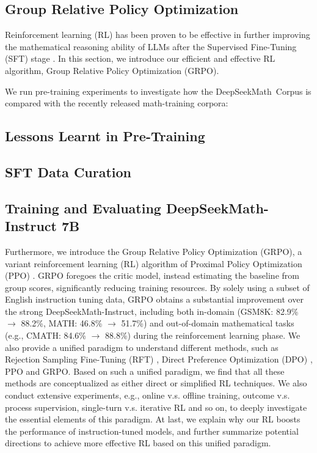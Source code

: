 \begin{itemize}[topsep=0pt]
\subsection{Group Relative Policy Optimization} Reinforcement learning (RL) has been proven to be effective in further improving the mathematical reasoning ability of LLMs after the Supervised Fine-Tuning (SFT) stage \citep{wang2023math,wizardmath}. In this section, we introduce our efficient and effective RL algorithm, Group Relative Policy Optimization (GRPO).

We run pre-training experiments to investigate how the DeepSeekMath~Corpus is compared with the recently released math-training corpora:

\subsection{Lessons Learnt in Pre-Training}

\subsection{SFT Data Curation}

\subsection{Training and Evaluating DeepSeekMath-Instruct 7B}

Furthermore, we introduce the Group Relative Policy Optimization (GRPO), a variant reinforcement learning (RL) algorithm of Proximal Policy Optimization (PPO) \citep{schulman2017proximal}. GRPO foregoes the critic model, instead estimating the baseline from group scores, significantly reducing training resources. By solely using a subset of English instruction tuning data, GRPO obtains a substantial improvement over the strong DeepSeekMath-Instruct, including both in-domain (GSM8K: 82.9\% $\rightarrow$ 88.2\%, MATH: 46.8\% $\rightarrow$ 51.7\%) and out-of-domain mathematical tasks (e.g., CMATH: 84.6\% $\rightarrow$ 88.8\%) during the reinforcement learning phase. We also provide a unified paradigm to understand different methods, such as Rejection Sampling Fine-Tuning (RFT) \citep{yuan2023scaling}, Direct Preference Optimization (DPO) \citep{dpo}, PPO and GRPO. Based on such a unified paradigm, we find that all these methods are conceptualized as either direct or simplified RL techniques. We also conduct extensive experiments, e.g., online v.s. offline training, outcome v.s. process supervision, single-turn v.s. iterative RL and so on, to deeply investigate the essential elements of this paradigm. At last, we explain why our RL boosts the performance of instruction-tuned models, and further summarize potential directions to achieve more effective RL based on this unified paradigm.


\end{itemize}
